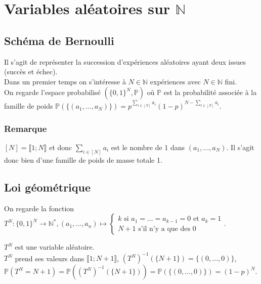 \documentclass[a4paper,10pt]{book} %
\newcommand{\N}{\mathbb{N}}
\renewcommand{\P}{\mathbb{P}} %
\begin{document}
\section{Variables aléatoires sur $\N$}
\subsection{Schéma de Bernoulli}
Il s'agit de représenter la succession d'expériences aléatoires ayant deux issues (succès et échec).\\

Dans un premier temps on s'intéresse à $N\in\N$ expériences avec $N\in\N$ fini.\\

On regarde l'espace probabilisé $(\{0,1\}^N,\P)$ où $\P$ est la probabilité associée à la famille de poids $\P(\{(a_1,...,a_N)\})=p^{\sum_{i\in [N]} a_i}(1-p)^{N-\sum_{i\in [N]} a_i}$.

\subsubsection{Remarque}
$[N]=\llbracket 1 ;N\rrbracket$ et donc $\sum_{i\in [N]} a_i$ est le nombre de 1 dans $(a_1,...,a_N)$. Il s'agit donc bien d'une famille de poids de masse totale 1.

\newpage

\subsection{Loi géométrique}
On regarde la fonction $T^N : \{0,1\}^N \rightarrow \N^*, (a_1,...,a_n)\mapsto \left\{\begin{array}{l}
k\text{ si }a_1=...=a_{k-1}=0\text{ et }a_k=1
\\
N+1 \text{ s'il n'y a que des }0
\end{array}\right.$.

$T^N$ est une variable aléatoire.\\

$T^N$ prend ses valeurs dans $\llbracket 1; N+1\rrbracket$, $(T^N)^{-1}(\{N+1\})=\{(0,...,0)\}$, $\P(T^N=N+1)=\P((T^N)^{-1}(\{N+1\}))=\P(\{(0,...,0)\})=(1-p)^N$.
\end{document}

